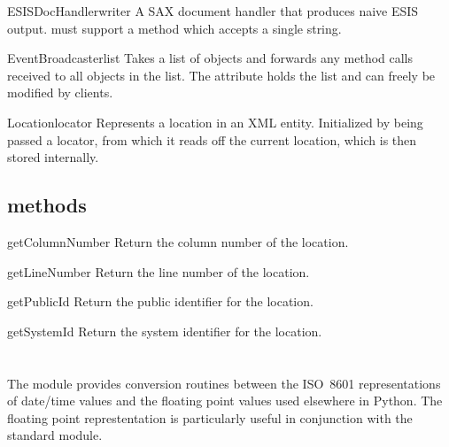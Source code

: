 \documentclass{howto}
\begin{document}
\begin{classdesc}{ESISDocHandler}{writer}
A SAX document handler that produces naive ESIS output.  
must support a  method which accepts a single string.
\end{classdesc}

\begin{classdesc}{EventBroadcaster}{list}
Takes a list of objects and forwards any method calls received
to all objects in the list. The attribute  holds the list and
can freely be modified by clients.
\end{classdesc}

\begin{classdesc}{Location}{locator}
Represents a location in an XML entity. Initialized by being passed
a locator, from which it reads off the current location, which is then
stored internally.
\end{classdesc}

\subsection{ methods}

\begin{methoddesc}{getColumnNumber}{}
Return the column number of the location.
\end{methoddesc}

\begin{methoddesc}{getLineNumber}{}
Return the line number of the location.
\end{methoddesc}

\begin{methoddesc}{getPublicId}{}
Return the public identifier for the location.
\end{methoddesc}

\begin{methoddesc}{getSystemId}{}
Return the system identifier for the location.
\end{methoddesc}

\section{
         }



The  module provides conversion routines
between the ISO~8601 representations of date/time values and the
floating point values used elsewhere in Python.  The floating point
represtentation is particularly useful in conjunction with the
standard  module.
\end{document}
